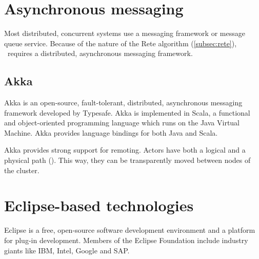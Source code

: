\section{Asynchronous messaging}

Most distributed, concurrent systems use a messaging framework or message queue service. Because of the nature of the Rete algorithm (\autoref{subsec:rete}), \iqd\ requires a distributed, asynchronous messaging framework.

\subsection{Akka}
\label{subsec:akka}


Akka is an open-source, fault-tolerant, distributed, asynchronous messaging framework developed by Typesafe. %
Akka is implemented in Scala, a functional and object-oriented programming language which runs on the Java Virtual Machine. Akka provides language bindings for both Java and Scala.


Akka provides strong support for remoting. Actors have both a logical and a physical path (). This way, they can be transparently moved between nodes of the cluster.



\section{Eclipse-based technologies}

Eclipse is a free, open-source software development environment and a platform for plug-in development. Members of the Eclipse Foundation include industry giants like IBM, Intel, Google and SAP.

